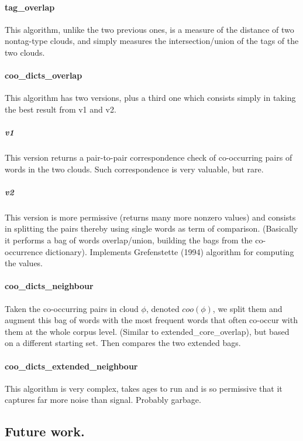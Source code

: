 \documentclass[11pt]{article}
\begin{document}
\paragraph{tag\_overlap}
This algorithm, unlike the two previous ones, is a measure of the distance of two nontag-type clouds, and simply measures the intersection/union of the tags of the two clouds.


\paragraph{coo\_dicts\_overlap}

This algorithm has two versions, plus a third one which consists simply in taking the best result from v1 and v2.

\subparagraph{v1} This version returns a pair-to-pair correspondence check of co-occur\-ring pairs of words in the two clouds. Such correspondence is very valuable, but rare.

\subparagraph{v2} This version is more permissive (returns many more nonzero values) and consists in splitting the pairs thereby using single words as term of comparison. (Basically it performs a bag of words overlap/union, building the bags from the co-occurrence dictionary). Implements Grefenstette (1994) algorithm for computing the values.

\paragraph{coo\_dicts\_neighbour}

Taken the co-occurring pairs in cloud $\phi$, denoted $coo(\phi)$, we split them and augment this bag of words with the most frequent words that often co-occur with them at the whole corpus level. (Similar to extended\_core\_overlap), but based on a different starting set. Then compares the two extended bags.

\paragraph{coo\_dicts\_extended\_neighbour}

This algorithm is very complex, takes ages to run and is so permissive that it captures far more noise than signal. Probably garbage.


\subsection{Future work.}
~
\end{document}
